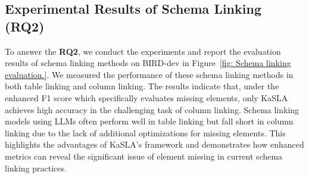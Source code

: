 \subsection{Experimental Results of Schema Linking (\textbf{RQ2})} \label{sec: Schema Linking Results} 
To answer the \textbf{RQ2}, we conduct the experiments and report the evaluation results of schema linking methods on BIRD-dev in Figure~\ref{fig: Schema linking evaluation.}. We measured the performance of these schema linking methods in both table linking and column linking. The results indicate that, under the enhanced F1 score which specifically evaluates missing elements, only KaSLA achieves high accuracy in the challenging task of column linking. Schema linking models using LLMs often perform well in table linking but fall short in column linking due to the lack of additional optimizations for missing elements. This highlights the advantages of KaSLA's framework and demonstrates how enhanced metrics can reveal the significant issue of element missing in current schema linking practices.


   
\begin{table}[!h]
   \begin{center}
   \caption{Schema linking performance with the proposed enhanced linking metric on BIRD-dev.}
\label{fig: Schema linking evaluation.}
\vspace{-2mm}
   \end{center}
   \end{table}





